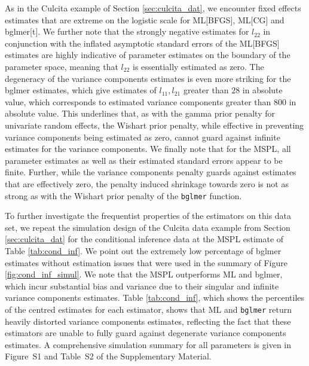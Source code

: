 \documentclass[11pt, a4paper]{article}
\theoremstyle{example} \newtheorem{example}{Example}[section]
\theoremstyle{theorem} \newtheorem{theorem}{Theorem}[section]
\begin{document}
As in the Culcita example of Section \ref{sec:culcita_dat}, we encounter fixed effects estimates that are extreme on the logistic scale for ML[BFGS], ML[CG] and bglmer[t]. We further note that the strongly negative estimates for $l_{22}$ in conjunction with the inflated asymptotic standard errors of the ML[BFGS] estimates are highly indicative of parameter estimates on the boundary of the parameter space, meaning that $l_{22}$ is essentially estimated as zero. The degeneracy of the variance components estimates is even more striking for the bglmer estimates, which give estimates of $l_{11},l_{21}$ greater than $28$ in absolute value, which corresponds to estimated variance components greater than $800$ in absolute value. This underlines that, as with the gamma prior penalty for univariate random effects, the Wishart prior penalty, while effective in preventing variance components being estimated as zero, cannot guard against infinite estimates for the variance components. We finally note that for the MSPL, all parameter estimates as well as their estimated standard errors appear to be finite. Further, while the variance components penalty guards against estimates that are effectively zero, the penalty induced shrinkage towards zero is not as strong as with the Wishart prior penalty of the \texttt{bglmer} function. 

To further investigate the frequentist properties of the estimators on this data set, we repeat the simulation design of the Culcita data example from Section \ref{sec:culcita_dat} for the conditional inference data at the MSPL estimate of Table \ref{tab:cond_inf}. We point out the extremely low percentage of bglmer estimates without estimation issues that were used in the summary of Figure \ref{fig:cond_inf_simul}. We note that the MSPL %
outperforms ML and bglmer, which incur substantial bias and variance due to their singular and infinite variance components estimates. Table \ref{tab:cond_inf}, which shows the percentiles of the centred estimates for each estimator, shows that ML and \texttt{bglmer} return heavily distorted variance components estimates, reflecting the fact that these estimators are unable to fully guard against degenerate variance components estimates. A comprehensive simulation summary for all parameters is given in Figure~S1 and Table~S2 of the Supplementary Material. 
\end{document}
